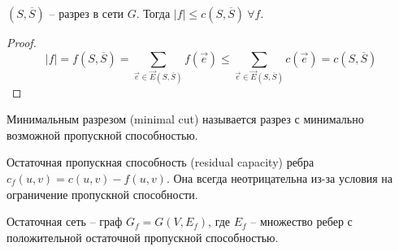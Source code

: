 	\begin{Lm}
		$(S, \overline{S})$ -- разрез в сети $G$. Тогда $|f| \leqslant c(S, \overline{S}) \ \forall f$.  
	\end{Lm}

	\begin{proof}
		\[|f| = f(S, \overline{S}) = \sum_{\overrightarrow{e} \in \overrightarrow{E}(S, \overline{S})} f(\overrightarrow{e}) \leqslant \sum_{\overrightarrow{e} \in \overrightarrow{E}(S, \overline{S})} c(\overrightarrow{e}) = c(S, \overline{S})\]
	\end{proof}

	\begin{Def}
		Минимальным разрезом (minimal cut) называется разрез с минимально возможной пропускной способностью.
	\end{Def}

	\begin{Def}
		Остаточная пропускная способность (residual capacity) ребра $c_f (u, v) = c(u, v) - f(u, v)$. Она всегда неотрицательна из-за условия на ограничение пропускной способности.
	\end{Def}

	\begin{Def}
		Остаточная сеть -- граф $G_f = G(V, E_f)$, где $E_f$ -- множество ребер с положительной остаточной пропускной способностью. 
	\end{Def}

